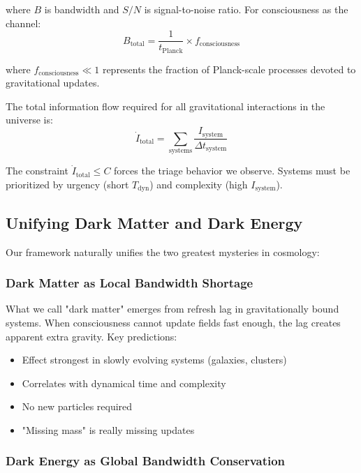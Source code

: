 \documentclass[twocolumn,prd,amsmath,amssymb,aps,superscriptaddress,nofootinbib]{revtex4-2}
\begin{document}
where $B$ is bandwidth and $S/N$ is signal-to-noise ratio. For consciousness as the channel:
\begin{equation}
B_{\text{total}} = \frac{1}{t_{\text{Planck}}} \times f_{\text{consciousness}}
\end{equation}

where $f_{\text{consciousness}} \ll 1$ represents the fraction of Planck-scale processes devoted to gravitational updates.

The total information flow required for all gravitational interactions in the universe is:
\begin{equation}
\dot{I}_{\text{total}} = \sum_{\text{systems}} \frac{I_{\text{system}}}{\Delta t_{\text{system}}}
\end{equation}

The constraint $\dot{I}_{\text{total}} \leq C$ forces the triage behavior we observe. Systems must be prioritized by urgency (short $T_{\text{dyn}}$) and complexity (high $I_{\text{system}}$).

\subsection{Unifying Dark Matter and Dark Energy}

Our framework naturally unifies the two greatest mysteries in cosmology:

\subsubsection{Dark Matter as Local Bandwidth Shortage}

What we call "dark matter" emerges from refresh lag in gravitationally bound systems. When consciousness cannot update fields fast enough, the lag creates apparent extra gravity. Key predictions:
\begin{itemize}
\item Effect strongest in slowly evolving systems (galaxies, clusters)
\item Correlates with dynamical time and complexity
\item No new particles required
\item "Missing mass" is really missing updates
\end{itemize}

\subsubsection{Dark Energy as Global Bandwidth Conservation}
\end{document}
